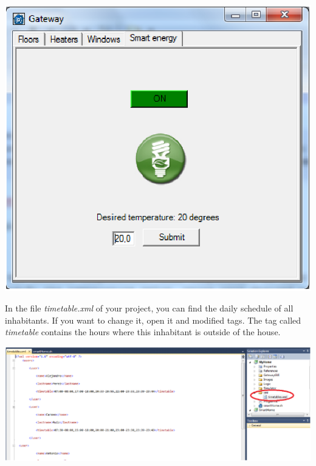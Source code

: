 \begin{center}
	\includegraphics[width=.75\linewidth]{images/desiredTemperatureSmartEnergy.eps}
	\\
\vspace{1cm}
\end{center}
In the file \emph{timetable.xml} of your project, you can find the daily schedule of all inhabitants. If you want to change it, open it and modified tags. The tag called \emph{timetable} contains the hours where this inhabitant is outside of the house.
\begin{center}
	\includegraphics[width=.99\linewidth]{images/xmlSmartEnergy.eps}
	\\
\vspace{1cm}
\end{center}

